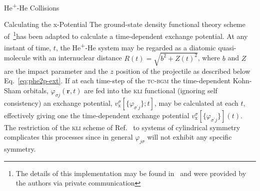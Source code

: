 \documentclass[letterpaper, 11 pt]{report}
\begin{document}
\begin{chapter}{\texorpdfstring{He\textsuperscript{+}}{He+}-He Collisions \label{chap:hephe}}
\begin{section}{Calculating the x-Potential \label{sec:pot}}
      The ground-state density functional theory scheme of~\cite{diamol}\footnote{The details of this
      implementation may be found in~\cite{diamol} and were provided by the authors via private
      communication}has been adapted to calculate a time-dependent exchange potential. At any instant of
      time, $t$, the He\textsuperscript{+}-He system may be regarded as a diatomic quasi-molecule with
      an internuclear distance $R(t) = \sqrt{b^2 + Z(t)^2}$, where $b$ and $Z$ are the impact parameter
      and the $z$ position of the projectile as described below Eq.~\eqref{eq:phe2p-ext}. If at each
      time-step of the \textsc{tc-bgm} the time-dependent Kohn-Sham orbitals,
      $\varphi_{\sigma j}(\mathbf{r},t)$ are fed into the \textsc{kli} functional (ignoring self
      consistency) an exchange potential, $v^{\sigma}_\mathrm{x}[ \{ \varphi_{\sigma^\prime j} \};t]$,
      may be calculated at each $t$, effectively giving one the time-dependent exchange potential
      $v^{\sigma}_\mathrm{x}[ \{ \varphi_{\sigma^\prime j} \}](t)$. The restriction of the \textsc{kli}
      scheme of Ref.~\cite{diamol} to systems of cylindrical symmetry complicates this processes since
      in general $\varphi_{j \sigma}$ will not exhibit any specific symmetry.
      

\end{section}
\end{chapter}
\end{document}
